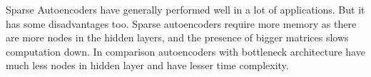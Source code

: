 Sparse Autoencoders have generally performed well in a lot of applications. But it has some disadvantages too. Sparse autoencoders 
require more memory as there are more nodes in the hidden layers, and the presence of bigger matrices slows computation down. In comparison autoencoders with bottleneck architecture have much less nodes in hidden layer and have lesser time complexity. 


